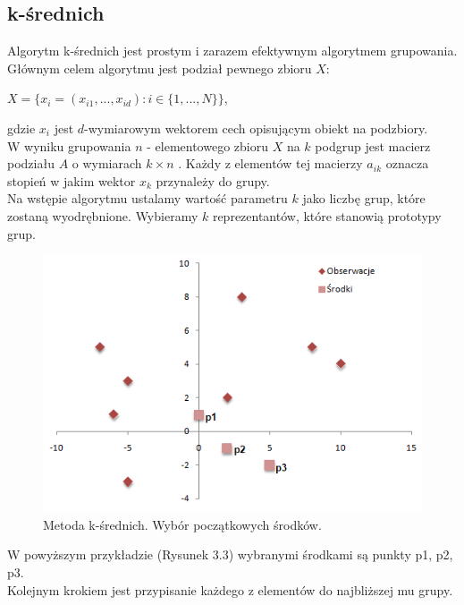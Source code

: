 \documentclass[12pt,a4paper]{report}
\begin{document}
\subsection{k-średnich}%
Algorytm k-średnich jest prostym i zarazem efektywnym algorytmem grupowania.
\\Głównym celem algorytmu jest podział pewnego zbioru $X$:
\begin{center}
$X = \{x_i = (x_{i1},...,x_{id}) : i \in \{1,...,N\}\}$,
\end{center}
gdzie $x_i$ jest $d$-wymiarowym wektorem cech opisującym obiekt na podzbiory.
\\W wyniku grupowania $n$ - elementowego zbioru $X$ na $k$ podgrup jest macierz podziału $A$ o wymiarach $k\times n$ . Każdy z elementów tej macierzy $a_{ik}$ oznacza stopień w jakim wektor $x_k$ przynależy do grupy.
\\Na wstępie algorytmu ustalamy wartość parametru $k$ jako liczbę grup, które zostaną wyodrębnione. Wybieramy $k$ reprezentantów, które stanowią prototypy grup.
\begin{figure}[H]
\centering
\includegraphics[scale=0.8]{ks_0.PNG} 
\caption{Metoda k-średnich. Wybór początkowych środków.}
\end{figure}
W powyższym przykładzie (Rysunek 3.3) wybranymi środkami są punkty p1, p2, p3.
\\
Kolejnym krokiem jest przypisanie każdego z elementów do najbliższej mu grupy.
\end{document}
